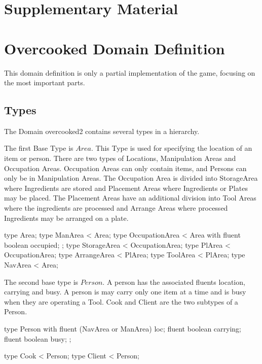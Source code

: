 %
\appendix

\section{Supplementary Material}


\section{Overcooked Domain Definition}
\label{app:domain}

This domain definition is only a partial implementation of the game, focusing on the most important parts.


\subsection{Types}
The Domain overcooked2 contains several types in a hierarchy.

The first Base Type is $Area$.
This Type is used for specifying the location of an item or person. There are two types of Locations, Manipulation Areas and Occupation Areas.
Occupation Areas can only contain items, and Persons can only be in Manipulation Areas.
The Occupation Area is divided into StorageArea where Ingredients are stored and Placement Areas where Ingredients or Plates may be placed.
The Placement Areas have an additional division into Tool Areas where the ingredients are processed and Arrange Areas where processed Ingredients may be arranged on a plate.

\begin{anmlcode}
type Area;
type ManArea < Area;
type OccupationArea < Area with {
  fluent boolean occupied;
};
type StorageArea < OccupationArea;
type PlArea < OccupationArea;
type ArrangeArea < PlArea;
type ToolArea < PlArea;
type NavArea < Area;
\end{anmlcode}

The second base type is $Person$.
A person has the associated fluents location, carrying and busy.
A person is may carry only one item at a time and is busy when they are operating a Tool.
Cook and Client are the two subtypes of a Person.

\begin{anmlcode}
type Person with {
  fluent (NavArea or ManArea) loc;
  fluent boolean carrying;
  fluent boolean busy;
};

type Cook < Person;
type Client < Person;
\end{anmlcode}

